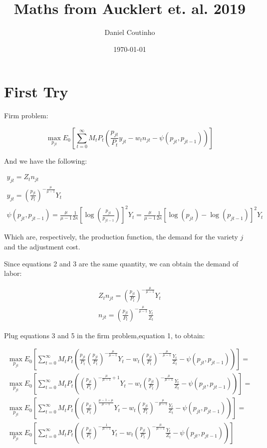 \documentclass[a4paper,10pt]{article}
\title{Maths from Aucklert et. al. 2019}
\author{Daniel Coutinho}
\date{\today}
\begin{document}
	
	\section{First Try} 
	
	Firm problem:
	
	\begin{equation}
		\max_{p_{jt}} E_0\left[\sum_{t=0}^{\infty} M_t P_t\left(\frac{p_{jt}}{P_t} y_{jt} - w_t n_{jt} - \psi(p_{jt},p_{jt-1})\right) \right]
	\end{equation}
	
	And we have the following:
	
	\begin{gather}
		y_{jt} = Z_t n_{jt}\\
		y_{jt} = \left(\frac{p_{jt}}{P_t}\right)^{-\frac{\mu}{\mu-1}}Y_t\\
		\psi(p_{jt},p_{jt-1}) = \frac{\mu}{\mu-1}\frac{1}{2\kappa}\left[\log\left(\frac{p_{jt}}{p_{jt-1}}\right)\right]^2Y_t = \frac{\mu}{\mu-1}\frac{1}{2\kappa}\left[\log(p_{jt})-\log(p_{jt-1})\right]^2Y_t
	\end{gather} 
	
	Which are, respectively, the production function, the demand for the variety $j$ and the adjustment cost.
	
	Since equations 2 and 3 are the same quantity, we can obtain the demand of labor:
	
	\begin{gather}
		Z_t n_{jt} = \left(\frac{p_{jt}}{P_t}\right)^{-\frac{\mu}{\mu-1}}Y_t \nonumber\\
		n_{jt} = \left(\frac{p_{jt}}{P_t}\right)^{-\frac{\mu}{\mu-1}}\frac{Y_t}{Z_t}
	\end{gather}

	Plug equations 3 and 5 in the firm problem,equation 1, to obtain:
	
	\begin{gather}
		\max_{p_{jt}} E_0\left[\sum_{t=0}^{\infty} M_t P_t \left(\frac{p_{jt}}{P_t}\left(\frac{p_{jt}}{P_t}\right)^{-\frac{\mu}{\mu-1}}Y_t - w_t \left(\frac{p_{jt}}{P_t}\right)^{-\frac{\mu}{\mu-1}}\frac{Y_t}{Z_t} - \psi(p_{jt},p_{jt-1})\right)\right] = \nonumber \\
		\max_{p_{jt}} E_0\left[\sum_{t=0}^{\infty} M_t P_t \left(\left(\frac{p_{jt}}{P_t}\right)^{-\frac{\mu}{\mu-1}+1}Y_t - w_t \left(\frac{p_{jt}}{P_t}\right)^{-\frac{\mu}{\mu-1}}\frac{Y_t}{Z_t} - \psi(p_{jt},p_{jt-1})\right)\right] = \nonumber \\
		\max_{p_{jt}} E_0\left[\sum_{t=0}^{\infty} M_t P_t \left(\left(\frac{p_{jt}}{P_t}\right)^{\frac{\mu -1 - \mu}{\mu-1}}Y_t - w_t \left(\frac{p_{jt}}{P_t}\right)^{-\frac{\mu}{\mu-1}}\frac{Y_t}{Z_t} - \psi(p_{jt},p_{jt-1})\right)\right] = \nonumber\\
		\max_{p_{jt}} E_0\left[\sum_{t=0}^{\infty} M_t P_t \left(\left(\frac{p_{jt}}{P_t}\right)^{-\frac{1}{\mu-1}}Y_t - w_t \left(\frac{p_{jt}}{P_t}\right)^{-\frac{\mu}{\mu-1}}\frac{Y_t}{Z_t} - \psi(p_{jt},p_{jt-1})\right)\right]
	\end{gather}
\end{document}

